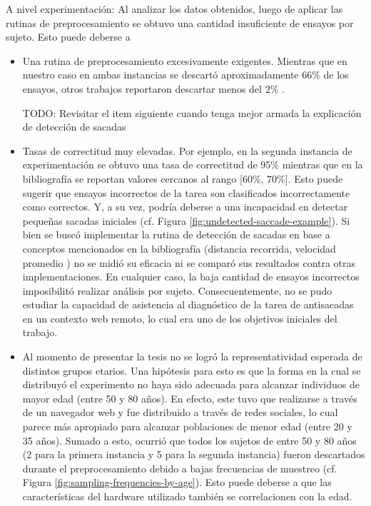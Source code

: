 A nivel experimentación: Al analizar los datos obtenidos, luego de aplicar las
rutinas de preprocesamiento se obtuvo una cantidad insuficiente de ensayos por
sujeto.
Esto puede deberse a 
\begin{itemize}
  \item Una rutina de preprocesamiento excesivamente exigentes.
  Mientras que en nuestro caso en ambas instancias se descartó aproximadamente
66\% de los ensayos, otros trabajos reportaron descartar menos del 2\%
\cite{unsworth_2011_distribution_analysis}. 

TODO: Revisitar el item siguiente cuando tenga mejor armada la explicación
      de detección de sacadas

  \item Tasas de correctitud muy elevadas.
  Por ejemplo, en la segunda instancia de experimentación se obtuvo una tasa de
correctitud de 95\% mientras que en la bibliografía se reportan valores
cercanos al rango [60\%, 70\%].
  Esto puede sugerir que ensayos incorrectos de la tarea son clasificados
incorrectamente como correctos.
  Y, a su vez, podría deberse a una incapacidad en detectar pequeñas sacadas
iniciales (cf. Figura \ref{fig:undetected-saccade-example}).
  Si bien se buscó implementar la rutina de detección de sacadas en base a
conceptos mencionados en la bibliografía (distancia recorrida, velocidad
promedio \cite{stuart_2019_saccade_detection_algorithms}) no se midió su
eficacia ni se comparó sus resultados contra otras implementaciones.
  En cualquier caso, la baja cantidad de ensayos incorrectos imposibilitó
realizar análisis por sujeto.
  Consecuentemente, no se pudo estudiar la capacidad de asistencia al
diagnóstico de la tarea de antisacadas en un contexto web remoto, lo cual era
uno de los objetivos iniciales del trabajo.

  \item Al momento de presentar la tesis no se logró la representatividad
esperada de distintos grupos etarios.
  Una hipótesis para esto es que la forma en la cual se distribuyó el
experimento no haya sido adecuada para alcanzar individuos de mayor edad (entre
50 y 80 años).
  En efecto, este tuvo que realizarse a través de un navegador web y fue
distribuido a través de redes sociales, lo cual parece más apropiado para
alcanzar poblaciones de menor edad (entre 20 y 35 años).
  Sumado a esto, ocurrió que todos los sujetos de entre 50 y 80 años (2 para la
primera instancia y 5 para la segunda instancia) fueron descartados durante el
preprocesamiento debido a bajas frecuencias de muestreo (cf. Figura
\ref{fig:sampling-frequencies-by-age}).
  Esto puede deberse a que las características del hardware utilizado también
se correlacionen con la edad.


\end{itemize}
